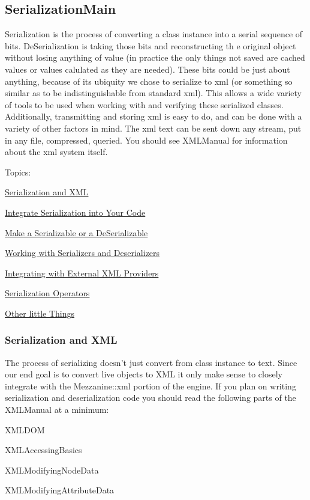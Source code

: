 \hypertarget{Serialization_SerializationMain}{}\subsection{SerializationMain}\label{Serialization_SerializationMain}
Serialization is the process of converting a class instance into a serial sequence of bits. DeSerialization is taking those bits and reconstructing th e original object without losing anything of value (in practice the only things not saved are cached values or values calulated as they are needed). These bits could be just about anything, because of its ubiquity we chose to serialize to xml (or something so similar as to be indistinguishable from standard xml). This allows a wide variety of tools to be used when working with and verifying these serialized classes. Additionally, transmitting and storing xml is easy to do, and can be done with a variety of other factors in mind. The xml text can be sent down any stream, put in any file, compressed, queried. You should see XMLManual for information about the xml system itself. \par
 \par
 Topics:
\begin{DoxyItemize}
\item \hyperlink{Serialization_serializationxml}{Serialization and XML}
\item \hyperlink{Serialization_serializationintegration}{Integrate Serialization into Your Code}
\begin{DoxyItemize}
\item \hyperlink{Serialization_serializationmaking}{Make a Serializable or a DeSerializable}
\item \hyperlink{Serialization_serializationserializers}{Working with Serializers and Deserializers}
\item \hyperlink{Serialization_serializationlegacy}{Integrating with External XML Providers}
\end{DoxyItemize}
\item \hyperlink{Serialization_serializationoperators}{Serialization Operators}
\item \hyperlink{Serialization_serializationmisc}{Other little Things} 
\end{DoxyItemize}\hypertarget{Serialization_serializationxml}{}\subsubsection{Serialization and XML}\label{Serialization_serializationxml}
The process of serializing doesn't just convert from class instance to text. Since our end goal is to convert live objects to XML it only make sense to closely integrate with the Mezzanine::xml portion of the engine. If you plan on writing serialization and deserialization code you should read the following parts of the XMLManual at a minimum:
\begin{DoxyItemize}
\item XMLDOM
\item XMLAccessingBasics
\item XMLModifyingNodeData
\item XMLModifyingAttributeData
\end{DoxyItemize}

